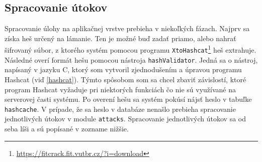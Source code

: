 \documentclass[slovak]{fitthesis}
\begin{document}
\subsection{Spracovanie útokov}
Spracovanie úlohy na aplikačnej vrstve prebieha v niekoľkých fázach. Najprv sa získa heš určený na lámanie. Ten je možné buď zadať priamo, alebo nahrať šifrovaný súbor, z ktorého systém pomocou programu \texttt{XtoHashcat}\footnote{\url{https://fitcrack.fit.vutbr.cz/?i=download}} heš extrahuje. Následné overí formát hešu pomocou nástroja \texttt{hashValidator}. Jedná sa o nástroj, napísaný v jazyku C, ktorý som vytvoril zjednodušením a úpravou programu Hashcat (viď \ref{hashcat}). Týmto spôsobom som sa chcel zbaviť závislostí, ktoré program Hashcat vyžaduje pri niektorých funkciách čo nie sú využívané na serverovej časti systému. Po overení hešu sa systém pokúsí nájsť heslo v tabuľke \texttt{hashcache}. V prípade, že sa heslo v databáze nenašlo prebieha spracovanie jednotlivých útokov v module \texttt{attacks}. Spracovanie jednotlivých útokov sa od seba líši a sú popísané v zozname nižšie.
\end{document}
